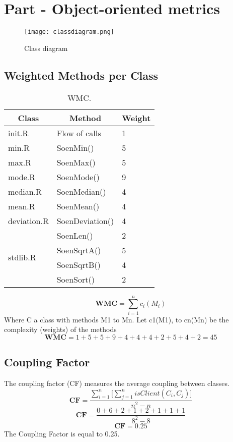 \documentclass[12pt]{article}
\begin{document}
\section{Part - Object-oriented metrics}
\begin{figure}[h]
\centering
\texttt{[image: classdiagram.png]}
\caption{Class diagram}
\end{figure}
\subsection{Weighted Methods per Class}

\begin{table}[h]
\centering
\begin{tabular}{|l|l|l|}
\hline
\multicolumn{1}{|c|}{\textbf{Class}} & \multicolumn{1}{c|}{\textbf{Method}} & \multicolumn{1}{c|}{\textbf{Weight}} \\ \hline
init.R & Flow of calls & 1 \\ \hline
min.R & SoenMin() & 5 \\ \hline
max.R & SoenMax() & 5 \\ \hline
mode.R & SoenMode() & 9 \\ \hline
median.R & SoenMedian() & 4 \\ \hline
mean.R & SoenMean() & 4 \\ \hline
deviation.R & SoenDeviation() & 4 \\ \hline
\multirow{4}{*}{stdlib.R} & SoenLen() & 2 \\ \cline{2-3} 
 & SoenSqrtA() & 5 \\ \cline{2-3} 
 & SoenSqrtB() & 4 \\ \cline{2-3} 
 & SoenSort() & 2 \\ \hline
\end{tabular}
\caption{WMC.}
\end{table}
\begin{equation}
    \textbf{WMC} =\sum^{n}_{i=1}{c_{i}(M_{i})}  
\end{equation}
Where C a class with methods M1 to Mn. Let c1(M1), to cn(Mn) be the complexity (weights) of the methods
\begin{equation}
    \textbf{WMC} = 1+5+5+9+4+4+4+2+5+4+2 = 45  
\end{equation}
\subsection{Coupling Factor}

The coupling factor (CF) measures the average coupling between classes. 
\begin{equation}
    \textbf{CF} =\frac{\sum^{n}_{i=1}{\Bigg[\sum^{n}_{j=1}{isClient(C_{i},C_{j})\Bigg]}}}{n^2-n}  
\end{equation}
\begin{equation}
    \textbf{CF} =\frac{0+6+2+1+2+1+1+1}{8^2-8}  
\end{equation}
\begin{equation}
    \textbf{CF} = 0.25
\end{equation}
The Coupling Factor is equal to 0.25.
\end{document}
